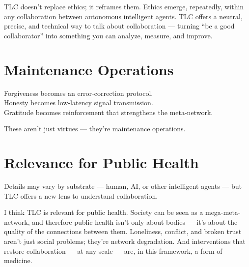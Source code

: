 \documentclass{article}
\begin{document}
TLC doesn’t replace ethics; it reframes them. Ethics emerge, repeatedly, within any collaboration between autonomous intelligent agents. TLC offers a neutral, precise, and technical way to talk about collaboration — turning “be a good collaborator” into something you can analyze, measure, and improve.

\section*{Maintenance Operations}

Forgiveness becomes an error-correction protocol. \\
Honesty becomes low-latency signal transmission. \\
Gratitude becomes reinforcement that strengthens the meta-network.

These aren’t just virtues — they’re maintenance operations.

\section*{Relevance for Public Health}

Details may vary by substrate — human, AI, or other intelligent agents — but TLC offers a new lens to understand collaboration.

I think TLC is relevant for public health. Society can be seen as a mega-meta-network, and therefore public health isn't only about bodies — it's about the quality of the connections between them. Loneliness, conflict, and broken trust aren’t just social problems; they're network degradation. And interventions that restore collaboration — at any scale — are, in this framework, a form of medicine.
\end{document}
